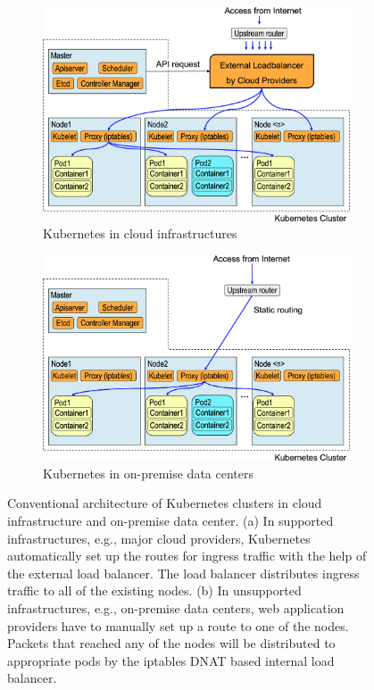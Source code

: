 \begin{figure}[tb]

  \begin{subfigure}[t]{\columnwidth}
    \centering
    \includegraphics[width=0.75\columnwidth]{Figs/K8sConventional}
    \caption{Kubernetes in cloud infrastructures}
    \label{fig:K8sConventional}
  \end{subfigure}

  \par\bigskip
  \par\bigskip

  \begin{subfigure}[t]{\columnwidth}
    \centering
    \includegraphics[width=0.75\columnwidth]{Figs/K8sConventional_bm}
    \caption{Kubernetes in on-premise data centers}
    \label{fig:K8sConventional_bm}
  \end{subfigure}

   \centering

  \begin{minipage}{1.0\columnwidth}
    \caption[Conventional architecture of Kubernetes clusters]
            {Conventional architecture of Kubernetes clusters in cloud infrastructure and on-premise data center.
(a) In supported infrastructures, e.g., major cloud providers, Kubernetes automatically set up the routes for ingress traffic with the help of the external load balancer.
The load balancer distributes ingress traffic to all of the existing nodes.
(b) In unsupported infrastructures, e.g., on-premise data centers, web application providers have to manually set up a route to one of the nodes.
Packets that reached any of the nodes will be distributed to appropriate pods by the iptables DNAT based internal load balancer.
            }
  \end{minipage}

\end{figure}

